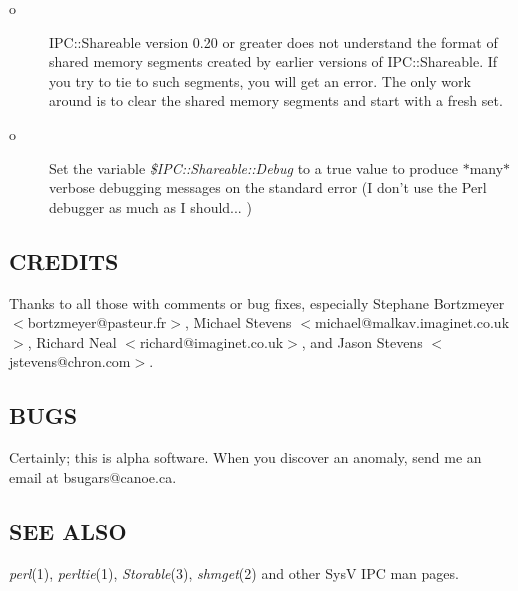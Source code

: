 \begin{description}
\item[o]
IPC::Shareable version 0.20 or greater does not understand the format
of shared memory segments created by earlier versions of
IPC::Shareable.  If you try to tie to such segments, you will get an
error.  The only work around is to clear the shared memory segments
and start with a fresh set.

\item[o]
Set the variable {\em \$IPC::Shareable::Debug\/} to a true value to produce
$\ast$many$\ast$ verbose debugging messages on the standard error (I don't use
the Perl debugger as much as I should... )

\end{description}

\subsection*{CREDITS}%

Thanks to all those with comments or bug fixes, especially Stephane
Bortzmeyer $<$bortzmeyer@pasteur.fr$>$, Michael Stevens
$<$michael@malkav.imaginet.co.uk$>$, Richard Neal
$<$richard@imaginet.co.uk$>$, and Jason Stevens $<$jstevens@chron.com$>$.

\subsection*{BUGS}
Certainly; this is alpha software. When you discover an
anomaly, send me an email at bsugars@canoe.ca.

\subsection*{SEE ALSO}
{\em perl\/}(1), {\em perltie\/}(1), {\em Storable\/}(3), {\em shmget\/}(2) and other SysV IPC man
pages.

